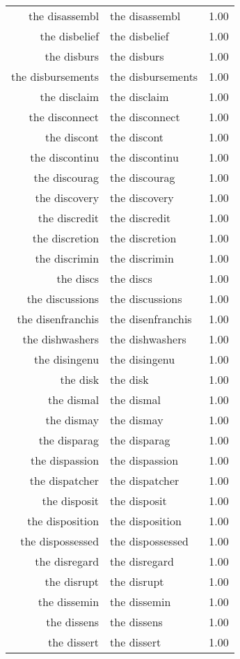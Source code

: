 \begin{table}[ht]
\begin{tabular}{rlr}
  the disassembl & the disassembl & 1.00 \\ 
  the disbelief & the disbelief & 1.00 \\ 
  the disburs & the disburs & 1.00 \\ 
  the disbursements & the disbursements & 1.00 \\ 
  the disclaim & the disclaim & 1.00 \\ 
  the disconnect & the disconnect & 1.00 \\ 
  the discont & the discont & 1.00 \\ 
  the discontinu & the discontinu & 1.00 \\ 
  the discourag & the discourag & 1.00 \\ 
  the discovery & the discovery & 1.00 \\ 
  the discredit & the discredit & 1.00 \\ 
  the discretion & the discretion & 1.00 \\ 
  the discrimin & the discrimin & 1.00 \\ 
  the discs & the discs & 1.00 \\ 
  the discussions & the discussions & 1.00 \\ 
  the disenfranchis & the disenfranchis & 1.00 \\ 
  the dishwashers & the dishwashers & 1.00 \\ 
  the disingenu & the disingenu & 1.00 \\ 
  the disk & the disk & 1.00 \\ 
  the dismal & the dismal & 1.00 \\ 
  the dismay & the dismay & 1.00 \\ 
  the disparag & the disparag & 1.00 \\ 
  the dispassion & the dispassion & 1.00 \\ 
  the dispatcher & the dispatcher & 1.00 \\ 
  the disposit & the disposit & 1.00 \\ 
  the disposition & the disposition & 1.00 \\ 
  the dispossessed & the dispossessed & 1.00 \\ 
  the disregard & the disregard & 1.00 \\ 
  the disrupt & the disrupt & 1.00 \\ 
  the dissemin & the dissemin & 1.00 \\ 
  the dissens & the dissens & 1.00 \\ 
  the dissert & the dissert & 1.00 \\ 

\end{tabular}
\end{table}

